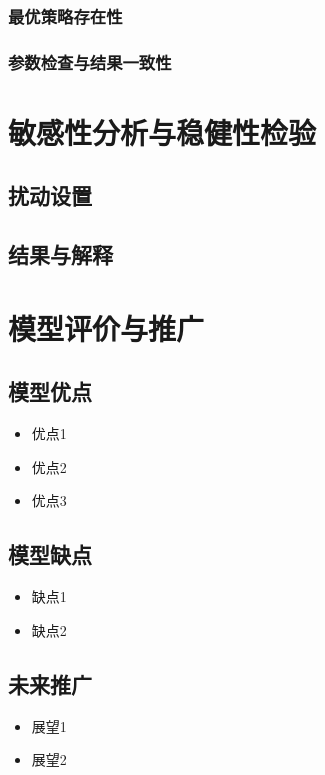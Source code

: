 \documentclass[withoutpreface,bwprint]{cumcmthesis}
\begin{document}
\subsubsection{最优策略存在性}

\subsubsection{参数检查与结果一致性}


\section{敏感性分析与稳健性检验}

\subsection{扰动设置}

\subsection{结果与解释}


\section{模型评价与推广}


\subsection{模型优点}
\begin{itemize}[itemindent=2em]
\item 优点1
\item 优点2
\item 优点3
\end{itemize}

\subsection{模型缺点}
\begin{itemize}[itemindent=2em]
\item 缺点1
\item 缺点2
\end{itemize}

\subsection{未来推广}
\begin{itemize}[itemindent=2em]
\item 展望1
\item 展望2
\end{itemize}
\end{document}
